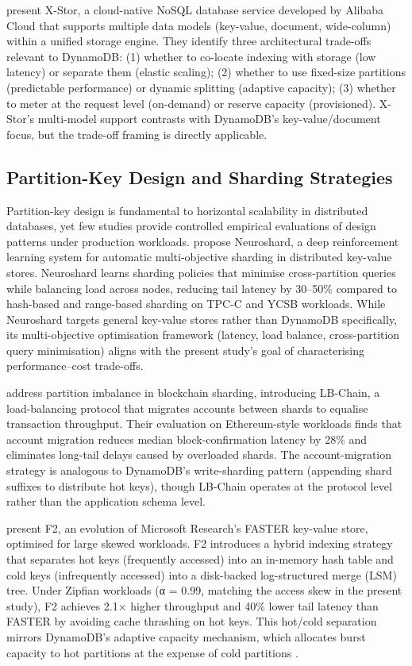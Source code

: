 \citet{lei2024xstor} present X-Stor, a cloud-native NoSQL database service developed by Alibaba Cloud that supports multiple data models (key-value, document, wide-column) within a unified storage engine. They identify three architectural trade-offs relevant to DynamoDB: (1) whether to co-locate indexing with storage (low latency) or separate them (elastic scaling); (2) whether to use fixed-size partitions (predictable performance) or dynamic splitting (adaptive capacity); (3) whether to meter at the request level (on-demand) or reserve capacity (provisioned). X-Stor's multi-model support contrasts with DynamoDB's key-value/document focus, but the trade-off framing is directly applicable.

\subsection{Partition-Key Design and Sharding Strategies}

Partition-key design is fundamental to horizontal scalability in distributed databases, yet few studies provide controlled empirical evaluations of design patterns under production workloads. \citet{eldeeb2022neuroshard} propose Neuroshard, a deep reinforcement learning system for automatic multi-objective sharding in distributed key-value stores. Neuroshard learns sharding policies that minimise cross-partition queries while balancing load across nodes, reducing tail latency by 30–50\% compared to hash-based and range-based sharding on TPC-C and YCSB workloads. While Neuroshard targets general key-value stores rather than DynamoDB specifically, its multi-objective optimisation framework (latency, load balance, cross-partition query minimisation) aligns with the present study's goal of characterising performance–cost trade-offs.

\citet{li2023lbchain} address partition imbalance in blockchain sharding, introducing LB-Chain, a load-balancing protocol that migrates accounts between shards to equalise transaction throughput. Their evaluation on Ethereum-style workloads finds that account migration reduces median block-confirmation latency by 28\% and eliminates long-tail delays caused by overloaded shards. The account-migration strategy is analogous to DynamoDB's write-sharding pattern (appending shard suffixes to distribute hot keys), though LB-Chain operates at the protocol level rather than the application schema level.

\citet{kanellis2025f2} present F2, an evolution of Microsoft Research's FASTER key-value store, optimised for large skewed workloads. F2 introduces a hybrid indexing strategy that separates hot keys (frequently accessed) into an in-memory hash table and cold keys (infrequently accessed) into a disk-backed log-structured merge (LSM) tree. Under Zipfian workloads (α = 0.99, matching the access skew in the present study), F2 achieves 2.1× higher throughput and 40\% lower tail latency than FASTER by avoiding cache thrashing on hot keys. This hot/cold separation mirrors DynamoDB's adaptive capacity mechanism, which allocates burst capacity to hot partitions at the expense of cold partitions \citep{aws2025adaptive}.

